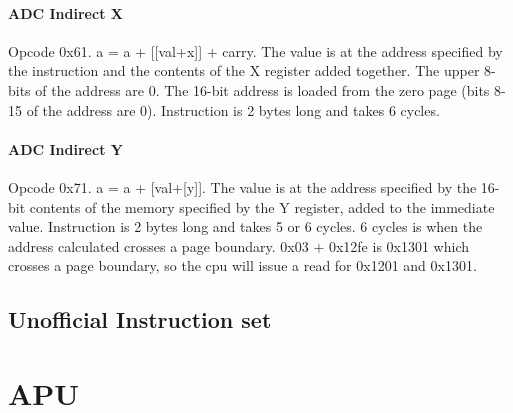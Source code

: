 \documentclass[letterpaper,12pt,twoside]{book}
\begin{document}
\subsubsection {ADC Indirect X}
Opcode 0x61. a = a + [[val+x]] + carry. The value is at the address specified by the instruction and the contents of the X register added together. The upper 8-bits of the address are 0. The 16-bit address is loaded from the zero page (bits 8-15 of the address are 0). Instruction is 2 bytes long and takes 6 cycles.
\subsubsection {ADC Indirect Y}
Opcode 0x71. a = a + [val+[y]]. The value is at the address specified by the 16-bit contents of the memory specified by the Y register, added to the immediate value. Instruction is 2 bytes long and takes 5 or 6 cycles. 6 cycles is when the address calculated crosses a page boundary. 0x03 + 0x12fe is 0x1301 which crosses a page boundary, so the cpu will issue a read for 0x1201 and 0x1301.


\section{Unofficial Instruction set}

\chapter{APU}
\end{document}
